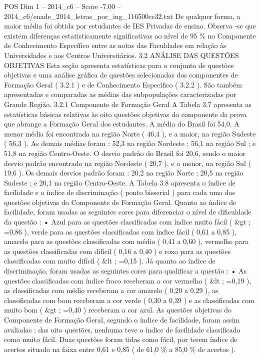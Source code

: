 \begin{textsample}{POS Dim 1 – 2014\_c6 – Score -7.00 – 2014\_c6/enade\_2014\_letras\_por\_ing\_116500ce32.txt}
De qualquer forma, a maior média foi obtida por estudantes de IES Privadas de ensino.
Observa -se que existem diferenças estatisticamente significativas ao nível de 95 \% no Componente de Conhecimento Específico entre as notas das Faculdades em relação às Universidades e aos Centros Universitários. 3.2 ANÁLISE DAS QUESTÕES OBJETIVAS Esta seção apresenta estatísticas para o conjunto de questões objetivas e uma análise gráfica de questões selecionadas dos componentes de Formação Geral ( 3.2.1 ) e de Conhecimento Específico ( 3.2.2 ).
São também apresentadas e comparadas as médias das subpopulações caracterizadas por Grande Região. 3.2.1 Componente de Formação Geral A Tabela 3.7 apresenta as estatísticas básicas relativas às oito questões objetivas do componente da prova que abrange a Formação Geral dos estudantes.
A média do Brasil foi 54,0.
A menor média foi encontrada na região Norte ( 46,4 ), e a maior, na região Sudeste ( 56,3 ).
As demais médias foram : 52,3 na região Nordeste ; 56,1 na região Sul ; e 51,8 na região Centro-Oeste.
O desvio padrão do Brasil foi 20,6, sendo o maior desvio padrão encontrado na região Nordeste ( 20,7 ), e o menor, na região Sul ( 19,6 ).
Os demais desvios padrão foram : 20,2 na região Norte ; 20,5 na região Sudeste ; e 20,1 na região Centro-Oeste.
A Tabela 3.8 apresenta o índice de facilidade e o índice de discriminação ( ponto bisserial ) para cada uma das questões objetivas do Componente de Formação Geral.
Quanto ao índice de facilidade, foram usadas as seguintes cores para diferenciar o nível de dificuldade da questão : • Azul para as questões classificadas com índice muito fácil ( \&gt ; =0,86 ), verde para as questões classificadas com índice fácil ( 0,61 a 0,85 ), amarelo para as questões classificadas com médio ( 0,41 a 0,60 ), vermelho para as questões classificadas com difícil ( 0,16 a 0,40 ) e roxo para as questões classificadas com muito difícil ( \&lt ; =0,15 ).
Já quanto ao índice de discriminação, foram usadas as seguintes cores para qualificar a questão : • As questões classificadas com índice fraco receberam a cor vermelho ( \&lt ; =0,19 ), as classificadas com médio receberam a cor amarelo ( 0,20 a 0,29 ), as classificadas com bom receberam a cor verde ( 0,30 a 0,39 ) e as classificadas com muito bom ( \&gt ; =0,40 ) receberam a cor azul.
As questões objetivas do Componente de Formação Geral, segundo o índice de facilidade, foram assim avaliadas : das oito questões, nenhuma teve o índice de facilidade classificado como muito fácil.
Duas questões foram tidas como fácil, por terem índice de acertos situado na faixa entre 0,61 e 0,85 ( de 61,0 \% a 85,0 \% de acertos ).

\end{textsample}
